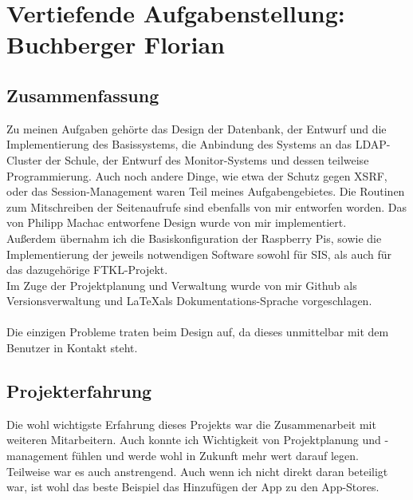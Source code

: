 \chapter[Buchberger]{Vertiefende Aufgabenstellung:\\Buchberger Florian}

\section{Zusammenfassung}
Zu meinen Aufgaben gehörte das Design der Datenbank, der Entwurf und die Implementierung des Basissystems, die Anbindung des Systems an das LDAP-Cluster der Schule, der Entwurf des Monitor-Systems und dessen teilweise Programmierung. Auch noch andere Dinge, wie etwa der Schutz gegen XSRF, oder das Session-Management waren Teil meines Aufgabengebietes. Die Routinen zum Mitschreiben der Seitenaufrufe sind ebenfalls von mir entworfen worden. Das von Philipp Machac entworfene Design wurde von mir implementiert.\\
Außerdem übernahm ich die Basiskonfiguration der Raspberry Pis, sowie die Implementierung der jeweils notwendigen Software sowohl für SIS, als auch für das dazugehörige FTKL-Projekt.\\
Im Zuge der Projektplanung und Verwaltung wurde von mir Github als Versionsverwaltung und \LaTeX  als Dokumentations-Sprache vorgeschlagen.\\
\\
Die einzigen Probleme traten beim Design auf, da dieses unmittelbar mit dem Benutzer in Kontakt steht.
\section{Projekterfahrung}
Die wohl wichtigste Erfahrung dieses Projekts war die Zusammenarbeit mit weiteren Mitarbeitern. Auch konnte ich Wichtigkeit von Projektplanung und -management fühlen und werde wohl in Zukunft mehr wert darauf legen.\\
Teilweise war es auch anstrengend. Auch wenn ich nicht direkt daran beteiligt war, ist wohl das beste Beispiel das Hinzufügen der App zu den App-Stores.

